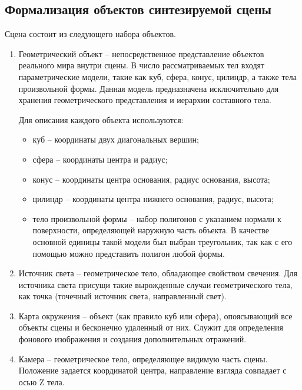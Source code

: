 \subsection{Формализация объектов синтезируемой сцены} \label{formalisation}
Сцена состоит из следующего набора объектов.
\begin{enumerate}
    \item Геометрический объект -- непосредственное представление объектов реального
          мира внутри сцены. В число рассматриваемых тел входят параметрические
          модели, такие как куб, сфера, конус, цилиндр, а также тела произвольной
          формы. Данная модель предназначена исключительно для хранения
          геометрического представления и иерархии составного тела.

          Для описания каждого объекта используются:
          \begin{itemize}
              \item куб -- координаты двух диагональных вершин;
              \item сфера -- координаты центра и радиус;
              \item конус -- координаты центра основания, радиус основания, высота;
              \item цилиндр -- координаты центра нижнего основания, радиус, высота;
              \item тело произвольной формы -- набор полигонов с указанием нормали к
                    поверхности, определяющей наружную часть объекта. В качестве основной
                    единицы такой модели был выбран треугольник, так как с его помощью
                    можно представить полигон любой формы.
          \end{itemize}
    \item Источник света -- геометрическое тело, обладающее свойством свечения. Для
          источника света присущи такие вырожденные случаи геометрического тела,
          как точка (точечный источник света, направленный свет).
    \item Карта окружения -- объект (как правило куб или сфера), опоясывающий
          все объекты сцены и бесконечно удаленный от них. Служит для
          определения фонового изображения и создания дополнительных отражений.
    \item Камера -- геометрическое тело, определяющее видимую часть сцены.
          Положение задается координатой центра, направление взгляда совпадает с
          осью Z тела.
\end{enumerate}


